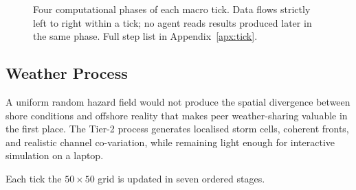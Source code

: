 \documentclass[cameraready]{Interspeech}
\begin{document}
\begin{figure}[htbp]
\centering
{}
\caption{Four computational phases of each macro tick. Data flows strictly left to right within a tick; no agent reads results produced later in the same phase. Full step list in Appendix~\ref{apx:tick}.}
\label{fig:tick-loop}
\end{figure}

\subsection{Weather Process}
\label{sec:weather-impl}

A uniform random hazard field would not produce the spatial divergence between shore conditions and offshore reality that makes peer weather-sharing valuable in the first place. The Tier-2 process generates localised storm cells, coherent fronts, and realistic channel co-variation, while remaining light enough for interactive simulation on a laptop.

Each tick the $50\times50$ grid is updated in seven ordered stages.
\end{document}
